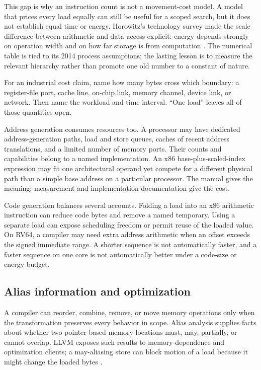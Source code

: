 This gap is why an instruction count is not a movement-cost model. A model
that prices every load equally can still be useful for a scoped search, but it
does not establish equal time or energy. Horowitz's technology survey made the
scale difference between arithmetic and data access explicit: energy depends
strongly on operation width and on how far storage is from computation
\autocite{horowitz2014energy}. The numerical table is tied to its 2014 process
assumptions; the lasting lesson is to measure the relevant hierarchy rather
than promote one old number to a constant of nature.

\begin{keyidea}[title={Count bytes and distance, not only move instructions}]
For an industrial cost claim, name how many bytes cross which boundary: a
register-file port, cache line, on-chip link, memory channel, device link, or
network. Then name the workload and time interval. ``One load'' leaves all of
those quantities open.
\end{keyidea}

Address generation consumes resources too. A processor may have dedicated
address-generation paths, load and store queues, caches of recent address
translations, and a limited number of memory ports. Their counts and capabilities
belong to a named implementation. An x86 base-plus-scaled-index expression
may fit one architectural operand yet compete for a different physical path
than a simple base address on a particular processor. The manual gives the
meaning; measurement and implementation documentation give the cost.

Code generation balances several accounts. Folding a load into an x86
arithmetic instruction can reduce code bytes and remove a named temporary.
Using a separate load can expose scheduling freedom or permit reuse of the
loaded value. On RV64, a compiler may need extra address arithmetic when an
offset exceeds the signed immediate range. A shorter sequence is not
automatically faster, and a faster sequence on one core is not automatically
better under a code-size or energy budget.

\subsection{Alias information and optimization}

A compiler can reorder, combine, remove, or move memory operations only when
the transformation preserves every behavior in scope. Alias analysis supplies
facts about whether two pointer-based memory locations must, may, partially,
or cannot overlap. LLVM exposes such results to memory-dependence and
optimization clients; a may-aliasing store can block motion of a load because
it might change the loaded bytes \autocite{llvm2026alias}.

